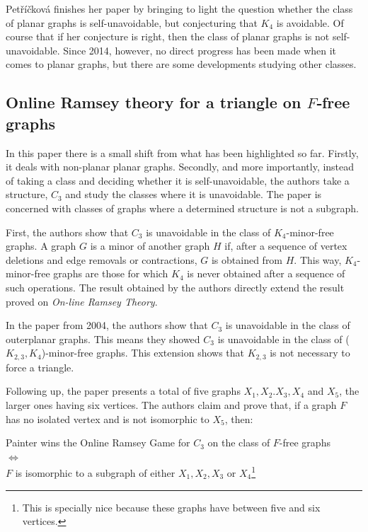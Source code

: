 Petříčková finishes her paper by bringing to light the question whether the class of planar graphs is self-unavoidable, but conjecturing that $K_4$ is avoidable. Of course that if her conjecture is right, then the class of planar graphs is not self-unavoidable. Since 2014, however, no direct progress has been made when it comes to planar graphs, but there are some developments studying other classes.

\subsection*{Online Ramsey theory for a triangle on $F$‐free graphs\cite{3}}

In this paper there is a small shift from what has been highlighted so far. Firstly, it deals with non-planar planar graphs. Secondly, and more importantly, instead of taking a class and deciding whether it is self-unavoidable, the authors take a structure, $C_3$ and study the classes where it is unavoidable. The paper is concerned with classes of graphs where a determined structure is not a subgraph.

First, the authors show that $C_3$ is unavoidable in the class of $K_4$-minor-free graphs. A graph $G$ is a minor of another graph $H$ if, after a sequence of vertex deletions and edge removals or contractions, $G$ is obtained from $H$. This way, $K_4$-minor-free graphs are those for which $K_4$ is never obtained after a sequence of such operations. The result obtained by the authors directly extend the result proved on \textit{On-line Ramsey Theory}.

In the paper from 2004, the authors show that $C_3$ is unavoidable in the class of outerplanar graphs. This means they showed $C_3$ is unavoidable in the class of ($K_{2,3},K_4$)-minor-free graphs. This extension shows that $K_{2,3}$ is not necessary to force a triangle.

Following up, the paper presents a total of five graphs $X_1, X_2. X_3, X_4$ and $X_5$, the larger ones having six vertices. The authors claim and prove that, if a graph $F$ has no isolated vertex and is not isomorphic to $X_5$, then:
\begin{center}
Painter wins the Online Ramsey Game for $C_3$ on the class of $F$-free graphs\\$\iff$\\$F$ is isomorphic to a subgraph of either $X_1,X_2,X_3$ or $X_4$\footnote{This is specially nice because these graphs have between five and six vertices.}
\end{center}

